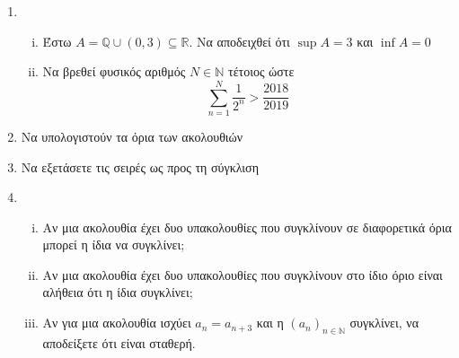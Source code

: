 \begin{enumerate}
    \item 
    \begin{enumerate}[i)]
        \item Έστω $ A = \mathbb{Q} \cup (0,3) \subseteq \mathbb{R} $. Να 
            αποδειχθεί ότι $ \sup A = 3 $ και $ \inf A = 0 $
        \item Να βρεθεί φυσικός αριθμός $N \in \mathbb{N} $ τέτοιος ώστε 
            \[
                \sum_{n=1}^{N} \frac{1}{2^{n}} > \frac{2018}{2019} 
            \] 
    \end{enumerate}
   
 
\item Να υπολογιστούν τα όρια των ακολουθιών 
    \begin{enumerate}[i)]
    \end{enumerate}
    
    \item Να εξετάσετε τις σειρές ως προς τη σύγκλιση    

    \item
        \begin{enumerate}[i)]
            \item Αν μια ακολουθία έχει δυο υπακολουθίες που συγκλίνουν σε διαφορετικά 
                όρια μπορεί η ίδια να συγκλίνει;
            \item Αν μια ακολουθία έχει δυο υπακολουθίες που συγκλίνουν 
                στο ίδιο όριο είναι αλήθεια ότι η ίδια συγκλίνει;
            \item Αν για μια ακολουθία ισχύει $ a_{n} = a_{n+3} $ και η 
                $ {(a_{n})}_{n \in \mathbb{N}} $ συγκλίνει, να αποδείξετε ότι 
                είναι σταθερή.
        \end{enumerate}


\end{enumerate}
